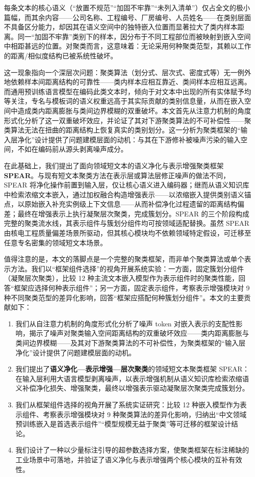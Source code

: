 \documentclass[10.5pt,compsoc,UTF8]{CjC}
\theoremstyle{mystyle}
\begin{document}
每条文本的核心语义（``放置不规范''``加固不牢靠''``未列入清单''）仅占全文的极小篇幅，而其余内容——公司名称、工程编号、厂房编号、人员姓名——在类别层面不具备区分能力，却因其在语义空间中的独特嵌入位置而显著拉大了类内样本距离。同一``加固不牢靠''类别下的样本，因分布于不同工程部位而被映射到嵌入空间中相距甚远的位置。对聚类而言，这意味着：无论采用何种聚类范型，其赖以工作的距离/相似度结构已被系统性破坏。

这一现象指向一个深层次问题：聚类算法（划分式、层次式、密度式等）无一例外地依赖样本间距离结构的可靠性——类内样本应相互靠近、类间样本应相互远离。而通用预训练语言模型在编码此类文本时，倾向于对文本中出现的所有实体赋予均等关注，专名与模板词的语义权重远高于其实际贡献的类别信息量，从而在嵌入空间中造成类内距离膨胀与类间边界模糊的双重破坏。本文首先从注意力机制的角度形式化分析了这一双重破坏效应，并论证了其对下游聚类算法的不可补偿性——聚类算法无法在扭曲的距离结构上恢复真实的类别划分。这一分析为聚类框架的``输入层净化''设计提供了问题建模层面的动机：与其在下游修补被噪声污染的输入空间，不如在编码前从源头剥离噪声成分。

在此基础上，我们提出了面向领域短文本的语义净化与表示增强聚类框架\textbf{SPEAR}。与现有短文本聚类方法在表示层或算法层修正噪声的做法不同，SPEAR 将净化操作前置到输入层，仅让核心语义进入编码器；继而从语义知识库中检索浓缩文本嵌入，通过加权融合构造增强表示——以浓缩嵌入提供类别语义锚点，以原始嵌入补充实例级上下文信息——从而补偿净化过程遗留的距离结构偏差；最终在增强表示上执行凝聚层次聚类，完成簇划分。SPEAR 的三个阶段构成完整的聚类流水线，其表示组件与簇划分组件均可按领域适配替换。虽然 SPEAR 由核电工程质量偏差场景所驱动，但其核心模块均不依赖领域特定假设，可迁移至任意专名密集的领域短文本场景。

值得注意的是，本文的落脚点是一个完整的聚类框架，而非单个聚类算法或单个表示方法。我们以``框架组件选择''的视角开展系统实验：一方面，固定簇划分组件（凝聚层次聚类），比较 12 种主流文本嵌入模型作为表示组件时的聚类性能，回答``框架应选择何种表示组件''；另一方面，固定表示组件，考察表示增强模块对 9 种不同聚类范型的差异化影响，回答``框架应搭配何种簇划分组件''。本文的主要贡献如下：
\begin{enumerate}[leftmargin=2em,itemsep=1pt]
  \item 我们从自注意力机制的角度形式化分析了噪声 token 对嵌入表示的支配性影响，揭示了噪声对聚类输入空间距离结构的双重破坏效应——类内距离膨胀与类间边界模糊——及其对下游聚类算法的不可补偿性，为聚类框架的``输入层净化''设计提供了问题建模层面的动机。
  \item 我们提出了\textbf{语义净化—表示增强—层次聚类}的领域短文本聚类框架 SPEAR：在输入层利用大语言模型剥离噪声，以表示增强机制从语义知识库检索浓缩语义补偿净化损失、增强聚类，最终以增强表示驱动凝聚层次聚类完成簇划分。
  \item 我们从框架组件选择的视角开展了系统实证研究：比较 12 种嵌入模型作为表示组件、考察表示增强模块对 9 种聚类算法的差异化影响，归纳出``中文领域预训练嵌入是首选表示组件''``模型规模无益于聚类''等可迁移的框架设计结论。
  \item 我们设计了一种以少量标注引导的超参数选择方案，使聚类框架在标注稀缺的工业场景中可落地，并验证了语义净化与表示增强两个核心模块的互补有效性。
\end{enumerate}
\end{document}
